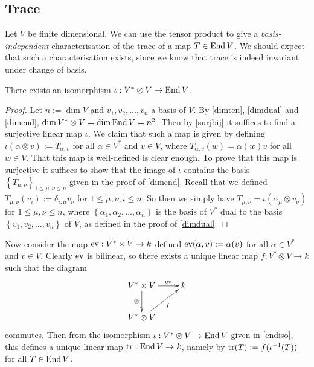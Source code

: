 \subsection{Trace}

Let $V$ be finite dimensional. We can use the tensor product to give a
\emph{basis-independent} characterisation of the trace of a map $T
\in \operatorname{End} V$. We should expect that such a characterisation exists,
since we know that trace is indeed invariant under change of basis.

\begin{pro} \label{endiso} There exists an isomorphism $\iota: V^*
  \otimes V \to \operatorname{End} V$.
  \begin{proof}
    Let $n := \dim V $ and $v_1,v_2,\ldots,v_n$ a basis of $V$. By \ref{dimten}, \ref{dimdual} and \ref{dimend}, $\dim V^* \otimes V = \dim \operatorname{End} V = n^2$. Then by \ref{surjbij} it suffices to find a surjective linear map $\iota$. We claim that such a map is given by defining $\iota(\alpha \otimes v) := T_{\alpha,v}$ for all $\alpha \in V^*$ and $v \in V$, where $T_{\alpha,v}(w) = \alpha(w)v$ for all $w \in V$. That this map is well-defined is clear enough. To prove that this map is surjective it suffices to show that the image of $\iota$ contains the basis $\left\{T_{\mu,\nu}\right\}_{1 \le \mu,\nu \le n}$ given in the proof of \ref{dimend}. Recall that we defined $T_{\mu,\nu}(v_i) := \delta_{i,\mu}v_\nu$ for $1 \le \mu,\nu,i \le n$. So then we simply have $T_{\mu,\nu} = \iota(\alpha_\mu \otimes v_\nu)$ for $1 \le \mu,\nu \le n$, where $\left\{\alpha_1,\alpha_2,\ldots,\alpha_n\right\}$ is the basis of $V^*$ dual to the basis $\left\{v_1,v_2,\ldots,v_n\right\}$ of $V$, as defined in the proof of \ref{dimdual}.
  \end{proof}
\end{pro}

\begin{rem} \label{trdiag}
  Now consider the map $\operatorname{ev}: V^* \times V \to k$ defined $\operatorname{ev}(\alpha,v) := \alpha(v)$ for all $\alpha \in V^*$ and $v \in V$. Clearly $\operatorname{ev}$ is bilinear, so there exists a unique linear map $f: V^* \otimes V \to k$ such that the diagram
\[ \xymatrix{ V^* \times V \ar[r]^-{\ev} \ar[d]_-{\otimes} & k \\ V^* \otimes V \ar[ur]_-{f} } \] 
commutes. Then from the isomorphism $\iota : V^* \otimes V \to \operatorname{End} V$ given in \ref{endiso}, this defines a unique linear map $\operatorname{tr} : \operatorname{End} V \to k$, namely by $\operatorname{tr}(T) := f(\iota^{-1}(T))$ for all $T \in \operatorname{End} V$.
\end{rem}

